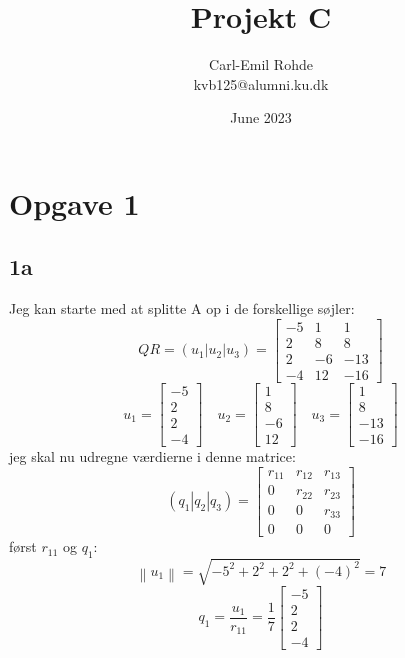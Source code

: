 \documentclass{article}
\title{Projekt C}
\author{Carl-Emil Rohde \\ kvb125@alumni.ku.dk}
\date{June 2023}
\begin{document}
\maketitle

\section*{Opgave 1}

\subsection*{1a}
Jeg kan starte med at splitte A op i de forskellige søjler:
$$
QR=\left(u_1\left|u_2\right| u_3\right)=\left[\begin{array}{ccc}
-5 & 1 & 1 \\
2 & 8 & 8 \\
2 & -6 & -13 \\
-4 & 12 & -16
\end{array}\right]
$$
$$
u_1=\left[\begin{array}{c}
-5 \\
2 \\
2 \\
-4
\end{array}\right] \quad u_2=\left[\begin{array}{c}
1 \\
8 \\
-6 \\
12
\end{array}\right] \quad u_3=\left[\begin{array}{c}
1 \\
8 \\
-13 \\
-16
\end{array}\right]
$$
jeg skal nu udregne værdierne i denne matrice:
$$
\left(q_1\left|q_2\right| q_3\right)=\left[\begin{array}{ccc}
r_{11} & r_{12} & r_{13} \\
0 & r_{22} & r_{23} \\
0 & 0 & r_{33} \\
0 & 0 & 0
\end{array}\right]
$$
først $r_11$ og $q_1$:
$$
\left\|u_1\right\|=\sqrt{-5^2+2^2+2^2+(-4)^2}=7
$$
$$
q_1=\frac{u_1}{r_{11}}=\frac{1}{7}\left[\begin{array}{c}
-5 \\
2 \\
2 \\
-4
\end{array}\right]
$$
\end{document}
